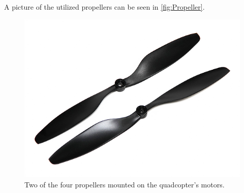 A picture of the utilized propellers can be seen in \autoref{fig:Propeller}.

\begin{figure}[H]
	\centering
	\includegraphics[scale=0.57]{figures/propellerphoto.png}
	\caption{Two of the four propellers mounted on the quadcopter's motors.\cite{HkingPropeller}}
	\label{fig:Propeller}
\end{figure}
